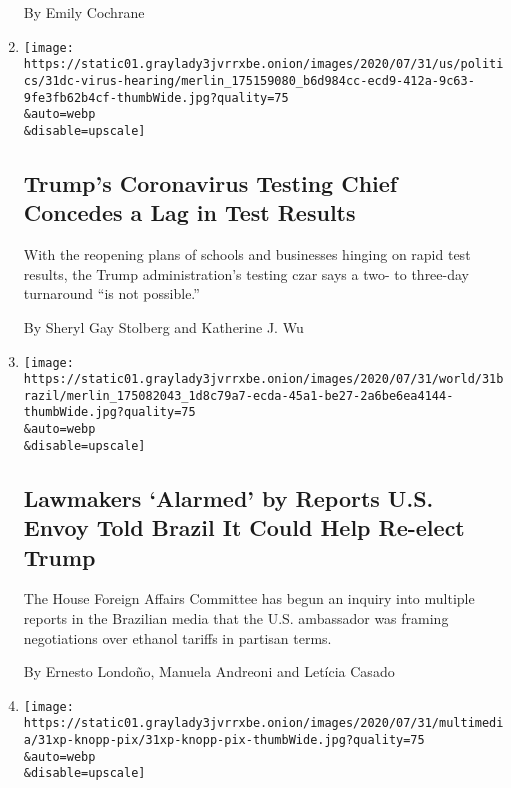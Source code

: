 \begin{enumerate}
  By Emily Cochrane
\item
  \href{/2020/07/31/us/politics/trump-coronavirus-testing.html}{}

  \texttt{[image: https://static01.graylady3jvrrxbe.onion/images/2020/07/31/us/politics/31dc-virus-hearing/merlin\_175159080\_b6d984cc-ecd9-412a-9c63-9fe3fb62b4cf-thumbWide.jpg?quality=75\\\&auto=webp\\\&disable=upscale]}

  \hypertarget{trumps-coronavirus-testing-chief-concedes-a-lag-in-test-results-1}{%
  \subsection{Trump's Coronavirus Testing Chief Concedes a Lag in Test
  Results}\label{trumps-coronavirus-testing-chief-concedes-a-lag-in-test-results-1}}

  With the reopening plans of schools and businesses hinging on rapid
  test results, the Trump administration's testing czar says a two- to
  three-day turnaround ``is not possible.''

  By Sheryl Gay Stolberg and Katherine J. Wu
\item
  \href{/2020/07/31/world/americas/brazil-trump-ethanol-chapman.html}{}

  \texttt{[image: https://static01.graylady3jvrrxbe.onion/images/2020/07/31/world/31brazil/merlin\_175082043\_1d8c79a7-ecda-45a1-be27-2a6be6ea4144-thumbWide.jpg?quality=75\\\&auto=webp\\\&disable=upscale]}

  \hypertarget{lawmakers-alarmed-by-reports-us-envoy-told-brazil-it-could-help-re-elect-trump}{%
  \subsection{Lawmakers `Alarmed' by Reports U.S. Envoy Told Brazil It
  Could Help Re-elect
  Trump}\label{lawmakers-alarmed-by-reports-us-envoy-told-brazil-it-could-help-re-elect-trump}}

  The House Foreign Affairs Committee has begun an inquiry into multiple
  reports in the Brazilian media that the U.S. ambassador was framing
  negotiations over ethanol tariffs in partisan terms.

  By Ernesto Londoño, Manuela Andreoni and Letícia Casado
\item
  \href{/2020/07/31/us/alaska-plane-crash-gary-knopp.html}{}

  \texttt{[image: https://static01.graylady3jvrrxbe.onion/images/2020/07/31/multimedia/31xp-knopp-pix/31xp-knopp-pix-thumbWide.jpg?quality=75\\\&auto=webp\\\&disable=upscale]}


\end{enumerate}
